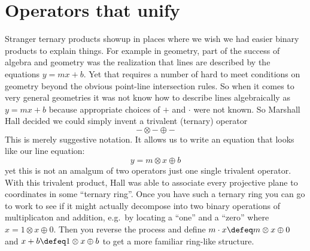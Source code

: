 
\section{Operators that unify}
Stranger ternary products showup in places where we wish we had easier binary products 
to explain things.  For example in geometry, part of the success of algebra and 
geometry was the realization that lines are described by the equations $y=mx+b$.
Yet that requires a number of hard to meet conditions on geometry beyond the obvious 
point-line intersection rules.  So when it comes to very general geometries 
it was not know how to describe lines algebraically as $y=mx+b$ because 
appropriate choices of $+$ and $\cdot$ were not known.
So Marshall Hall decided we could simply invent a trivalent (ternary) operator
\[
    -\otimes-\oplus -
\]
This is merely suggestive notation.  It allows us to write an equation 
that looks like our line equation:
\[
    y=m\otimes x\oplus b
\] 
yet this is not an amalgum of two operators just one single trivalent operator.
With this trivalent product, Hall was able to associate every 
projective plane to coordinates in some ``ternary ring''.  Once you have such a ternary ring you 
can go to work to see if it might actually decompose into two binary operations of multiplicaton 
and addition, e.g.\ by locating a ``one'' and a ``zero'' where $x=1\otimes x\oplus 0$.  Then 
you reverse the process and define $m\cdot x\defeq m\otimes x\oplus 0$ and $x+b\defeq 1\otimes x\oplus b$
to get a more familiar ring-like structure.
